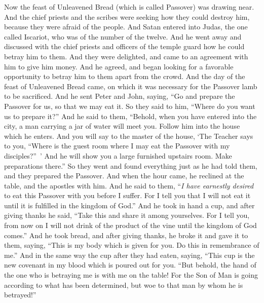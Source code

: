 \begin{biblechapter} %
 Now the feast of Unleavened Bread (which is called Passover) was drawing near.
\verse And the chief priests and the scribes were seeking how they could destroy him, because they were afraid of the people.
 And Satan entered into Judas, the one called Iscariot, who was of the number of the twelve.
\verse And he went away and discussed with the chief priests and officers of the temple guard how he could betray him to them.
\verse And they were delighted, and came to an agreement with him to give him money.
\verse And he agreed, and began looking for a favorable opportunity to betray him to them apart from the crowd.
 And the day of the feast of Unleavened Bread came, on which it was necessary for the Passover lamb to be sacrificed.
\verse And he sent Peter and John, saying, “Go and prepare the Passover for us, so that we may eat it.
\verse So they said to him, “Where do you want us to prepare it?”
\verse And he said to them, “Behold, when you have entered into the city, a man carrying a jar of water will meet you. Follow him into the house which he enters.
\verse And you will say to the master of the house, ‘The Teacher says to you, “Where is the guest room where I may eat the Passover with my disciples?” ’
\verse And he will show you a large furnished upstairs room. Make preparations there.”
\verse So they went and found everything just as he had told them, and they prepared the Passover.
 And when the hour came, he reclined at the table, and the apostles with him.
\verse And he said to them, “\textit{I have earnestly desired} to eat this Passover with you before I suffer.
\verse For I tell you that I will not eat it until it is fulfilled in the kingdom of God.”
\verse And he took in hand a cup, and after giving thanks he said, “Take this and share it among yourselves.
\verse For I tell you, from now on I will not drink of the product of the vine until the kingdom of God comes.”
\verse And he took bread, and after giving thanks, he broke it and gave it to them, saying, “This is my body which is given for you. Do this in remembrance of me.”
\verse And in the same way the cup after they had eaten, saying, “This cup is the new covenant in my blood which is poured out for you.
\verse “But behold, the hand of the one who is betraying me is with me on the table!
\verse For the Son of Man is going according to what has been determined, but woe to that man by whom he is betrayed!”

\end{biblechapter}
